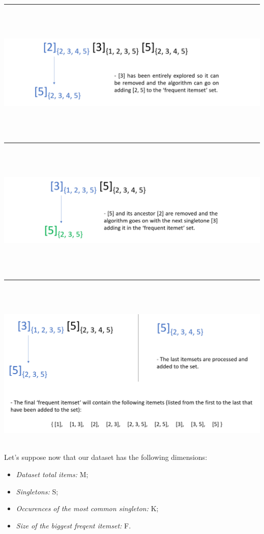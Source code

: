 \documentclass[]{report}
\begin{document}
	\rule{\textwidth}{0.4pt}
	\\\\
	\centerline{\includegraphics[scale=0.5]{./img/alg7}}
	\\\\
	\rule{\textwidth}{0.4pt}
	\\\\
	\centerline{\includegraphics[scale=0.5]{./img/alg8}}
	\\\\
	\rule{\textwidth}{0.4pt}
	\\\\
	\centerline{\includegraphics[scale=0.5]{./img/alg9}}
	\\
	Let's suppose now that our dataset has the following dimensions:
	\begin{itemize}
		\item \textit{Dataset total items:} M; 
		\item \textit{Singletons:} S;
		\item \textit{Occurences of the most common singleton:} K;
		\item \textit{Size of the biggest freqent itemset:} F.
	\end{itemize}
\end{document}
